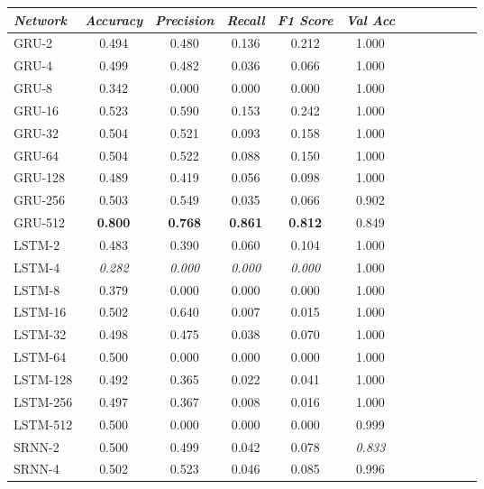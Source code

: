 \begin{table}
\begin{tabularx}{\textwidth}{@{}l*{10}{C}c@{}}
 \toprule
  \textit{Network} &  \textit{Accuracy} &  \textit{Precision} &  \textit{Recall} &  \textit{F1 Score} &  \textit{Val Acc} \\
 \midrule
    GRU-2 &     0.494 &      0.480 &   0.136 &     0.212 &    1.000 \\
    GRU-4 &     0.499 &      0.482 &   0.036 &     0.066 &    1.000 \\
    GRU-8 &     0.342 &      0.000 &   0.000 &     0.000 &    1.000 \\
   GRU-16 &     0.523 &      0.590 &   0.153 &     0.242 &    1.000 \\
   GRU-32 &     0.504 &      0.521 &   0.093 &     0.158 &    1.000 \\
   GRU-64 &     0.504 &      0.522 &   0.088 &     0.150 &    1.000 \\
  GRU-128 &     0.489 &      0.419 &   0.056 &     0.098 &    1.000 \\
  GRU-256 &     0.503 &      0.549 &   0.035 &     0.066 &    0.902 \\
  GRU-512 &     \textbf{0.800} &      \textbf{0.768} &   \textbf{0.861} &     \textbf{0.812} &    0.849 \\
   LSTM-2 &     0.483 &      0.390 &   0.060 &     0.104 &    1.000 \\
   LSTM-4 &     \textit{0.282} &      \textit{0.000} &   \textit{0.000} &     \textit{0.000} &    1.000 \\
   LSTM-8 &     0.379 &      0.000 &   0.000 &     0.000 &    1.000 \\
  LSTM-16 &     0.502 &      0.640 &   0.007 &     0.015 &    1.000 \\
  LSTM-32 &     0.498 &      0.475 &   0.038 &     0.070 &    1.000 \\
  LSTM-64 &     0.500 &      0.000 &   0.000 &     0.000 &    1.000 \\
 LSTM-128 &     0.492 &      0.365 &   0.022 &     0.041 &    1.000 \\
 LSTM-256 &     0.497 &      0.367 &   0.008 &     0.016 &    1.000 \\
 LSTM-512 &     0.500 &      0.000 &   0.000 &     0.000 &    0.999 \\
   SRNN-2 &     0.500 &      0.499 &   0.042 &     0.078 &    \textit{0.833} \\
   SRNN-4 &     0.502 &      0.523 &   0.046 &     0.085 &    0.996 \\

\end{tabularx}
\end{table}
